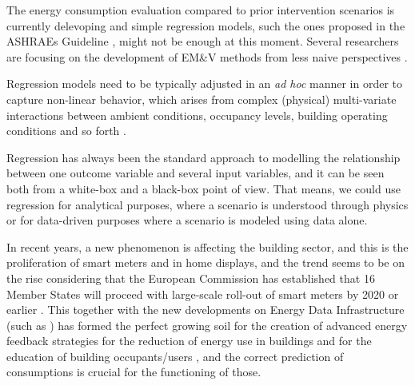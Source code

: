 \documentclass[10pt, conference, compsocconf]{IEEEtran}
\begin{document}



The energy consumption evaluation compared to prior intervention scenarios is currently delevoping and  simple regression models, such the ones proposed in the ASHRAEs Guideline \cite{ashrae2002ashrae}, might not be enough at this moment. Several researchers are focusing on the development of EM\&V  methods from less naive perspectives \cite{ramalloidentifying}. 


Regression models need to be typically adjusted in an \textit{ad hoc} manner in order to capture non-linear behavior, which arises from complex (physical) multi-variate interactions between ambient conditions, occupancy levels, building operating conditions and so forth \cite{heo2012gaussian}.


Regression has always been the standard approach to modelling the relationship between one outcome variable  and several input variables, and it can be seen both from a white-box and a black-box point of view. That means, we could use regression for analytical purposes, where a scenario is understood through physics or for data-driven purposes where a scenario is modeled using data alone. 


In recent years, a new phenomenon is affecting the building sector, and this is the proliferation of smart meters and in home displays, and the trend seems to be on the rise considering that the European Commission has established that 16 Member States will proceed with large-scale roll-out of smart meters by 2020 or earlier \cite{ec2014report}. This together with the new developments on Energy Data Infrastructure (such as \cite{terroso2017open}) has formed the perfect growing soil for the creation of advanced energy feedback strategies for the reduction of energy use in buildings and for the education of building occupants/users \cite{how2017} , and the correct prediction of consumptions is crucial for the functioning of those.
\end{document}

